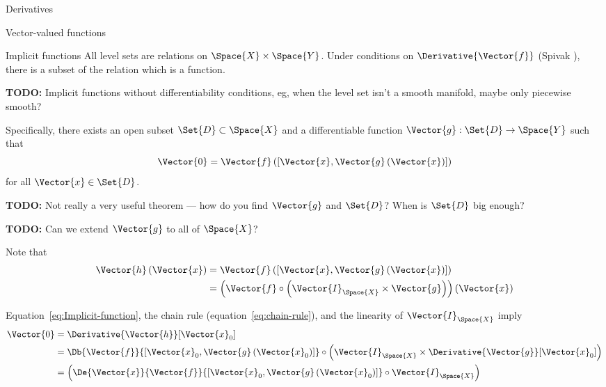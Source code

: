 \begin{plSection}{Derivatives}
\begin{plSection}{Vector-valued functions}
\begin{plSection}{Implicit functions}
All level sets are relations on $\Space{X} \times \Space{Y}$.
Under conditions on $\Derivative{\Vector{f}}$
(Spivak \cite[Theorem~2-12]{Spivak:1965:CalculusOnManifolds}),
there is a subset of the relation which is a 
function.

\textbf{TODO:} Implicit functions without differentiability
conditions, eg, when the level set isn't a smooth manifold,
maybe only piecewise smooth?

Specifically, 
there exists an open subset $\Set{D}  \subset \Space{X}$
and a differentiable function $\Vector{g} : \Set{D} \rightarrow \Space{Y}$
such that 
\begin{equation}\label{eq:Implicit-function}
\Vector{0} = \Vector{f}\left( \left[ \Vector{x} , \Vector{g} \left( \Vector{x} \right) \right] \right)
\end{equation}
for all 
$\Vector{x} \in  \Set{D}$.

\textbf{TODO:} Not really a very useful theorem --- 
how do you find $\Vector{g}$ and $\Set{D}$?
When is $\Set{D}$ big enough?

\textbf{TODO:} Can we extend $\Vector{g}$ to all of $\Space{X}$?

Note that 
\begin{equation}
\begin{aligned}
\Vector{h}\left(\Vector{x}\right) 
& = 
\Vector{f}\left( \left[ \Vector{x} , \Vector{g} \left( \Vector{x} \right) \right] \right)
\\
& =
\left( \Vector{f} \circ \left( \Vector{I}_{\Space{X}} \times \Vector{g} \right) \right) 
\left( \Vector{x} \right)
\end{aligned} 
\end{equation}

Equation~\ref{eq:Implicit-function}, 
the chain rule (equation~\ref{eq:chain-rule}),
and the linearity of $\Vector{I}_{\Space{X}}$
imply
\begin{equation}\label{eq:Implicit-derivative}
\begin{aligned}
\Vector{0}
 & = \Derivative{\Vector{h}}[\Vector{x}_0]
\\
& = 
\Db{\Vector{f}}
{\left[ \Vector{x}_0 , \Vector{g}\left( \Vector{x}_0 \right) \right]}
\circ \left( 
\Vector{I}_{\Space{X}} 
\times 
\Derivative{\Vector{g}}[\Vector{x}_0]
\right)
\\
& = 
\left(
\De{\Vector{x}}
{\Vector{f}}
{\left[ 
\Vector{x}_0 , \Vector{g} 
\left( \Vector{x}_0 \right)
 \right]}
\circ 
\Vector{I}_{\Space{X}}
\right)
\end{aligned}
\end{equation}


\end{plSection}
\end{plSection}
\end{plSection}

